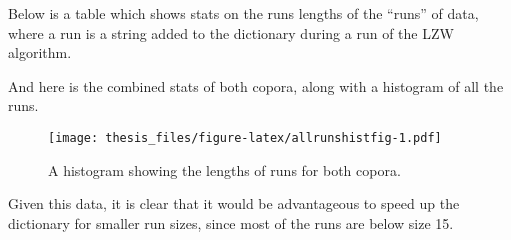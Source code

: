 \documentclass[12pt,twoside]{reedthesis}
\begin{document}
Below is a table which shows stats on the runs lengths of the ``runs'' of data, where a run is a string added to the dictionary during a run of the LZW algorithm.
\begin{table}[H]

\caption{\label{tab:runstatsfig}Run Lengths for Corpus 1}
\centering
{}
\end{table}
\begin{table}[H]

\caption{\label{tab:runstatsfig}Run Lengths for Corpus 2}
\centering
{}
\end{table}
And here is the combined stats of both copora, along with a histogram of all the runs.
\begin{table}[H]

\caption{\label{tab:bothrunsfig}Run lengths for both corpora}
\centering
{}
\end{table}
\begin{figure}
\centering
\texttt{[image: thesis\_files/figure-latex/allrunshistfig-1.pdf]}
\caption{\label{fig:allrunshistfig}A histogram showing the lengths of runs for both copora.}
\end{figure}
Given this data, it is clear that it would be advantageous to speed up the dictionary for smaller run sizes, since most of the runs are below size 15.
\end{document}
